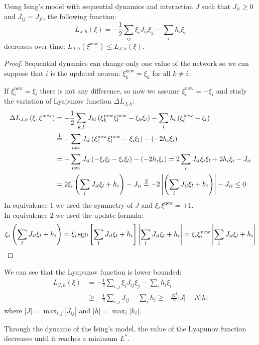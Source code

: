 \begin{lemma} \label{lemma:Lyap}
    Using Ising's model with sequential dynamics and interaction $J$ such that $J_{ii} \geq 0$ and $J_{ij}=J_{ji}$, the following function:
    \[
          L_{J,h}(\xi) = -\frac{1}{2} \sum_{ij} \xi_i J_{ij} \xi_j - \sum_{i} h_i \xi_i
    \]
    decreases over time: $L_{J,h}\left(\xi^{\text{new}}\right) \leq L_{J,h}\left(\xi\right)$.

    \begin{proof}
    \noindent Sequential dynamics can change only one value of the network so we can suppose that $i$ is the updated neuron: $\xi_k^{\text{new}} = \xi_k$ for all $k\neq i$.

    \noindent If $\xi_i^{\text{new}} = \xi_i$ there is not any difference, so now we assume $\xi_i^{\text{new}} = -\xi_i$ and study the variation of Lyapunov function $\Delta L_{J,h}$:
    \begin{align*}
         \Delta L_{J,h}\left(\xi,\xi^{\text{new}}\right) &= - \frac12 \sum_{k,l} J_{kl}\left(\xi_k^{\text{new}}\xi_l^{\text{new}} - \xi_k \xi_l\right) - \sum_l h_l \left(\xi_l^{\text{new}}-\xi_l\right) \\
         &\overset{1}{=} - \sum_{l \neq i} J_{il}\left(\xi_i^{\text{new}}\xi_l^{\text{new}} - \xi_i \xi_l\right) - (-2 h_i\xi_i) \\
         &= - \sum_{l \neq i} J_{il}\left(-\xi_i\xi_l - \xi_i \xi_l\right) - (-2 h_i\xi_i) = 2 \sum_l J_{il} \xi_i \xi_l + 2h_i \xi_i - J_{ii} \\
         &= 2 \xi_i \left( \sum_l J_{il} \xi_l + h_i \right) - J_{ii} \overset{2}{=} -2\left|\left( \sum_l J_{il} \xi_l +h_i \right)\right| - J_{ii} \leq 0
    \end{align*}
    In equivalence $1$ we used the symmetry of $J$ and $\xi,\xi^{\text{new}} = \pm1$.\\ In equivalence $2$ we used the update formula:
    \[
        \xi_i\left( \sum_l J_{il} \xi_l + h_i \right) = \xi_i\operatorname{sgn}\left[\sum_l J_{il} \xi_l +h_i \right]\left|\sum_l J_{il} \xi_l +h_i \right| = \xi_i\xi_i^{\text{new}}\left|\sum_l J_{il} \xi_l +h_i \right|
    \]
    \end{proof}
\end{lemma}

\begin{remark}
    We can see that the Lyapunov function is lower bounded:
\begin{align*}
    L_{J,h}(\xi) &= -\frac12 \sum_{i,j} \xi_iJ_{ij}\xi_j - \sum_i h_i\xi_i \\
    &\geq -\frac12 \sum_{i,j} J_{ij} - \sum_i h_i \geq -\frac{N^2}{2} |J| - N |h|
\end{align*}
where $|J| = \max_{i,j} |J_{ij}|$ and $|h| = \max_i |h_i|$.

\noindent Through the dynamic of the Ising's model, the value of the Lyapunov function decreases until it reaches a minimum $L^*$.
\end{remark}

